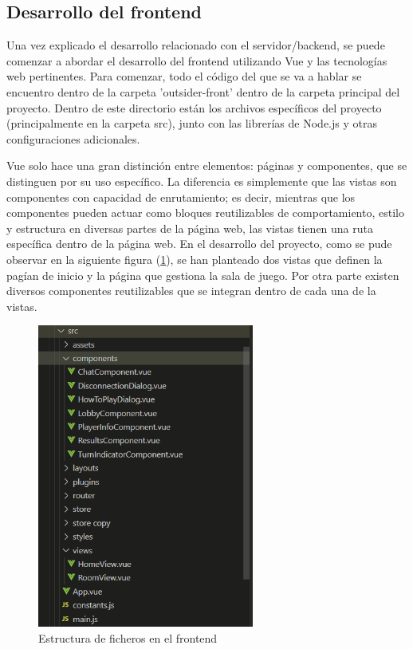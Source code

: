 \subsection{Desarrollo del frontend} \label{Desarrollo del frontend}

Una vez explicado el desarrollo relacionado con el servidor/backend, se puede comenzar a abordar el desarrollo del frontend utilizando Vue
y las tecnologías web pertinentes. Para comenzar, todo el código del que se va a hablar se encuentro dentro de la carpeta 'outsider-front' dentro de la carpeta
principal del proyecto. Dentro de este directorio están los archivos específicos del proyecto (principalmente en la carpeta src), junto con las librerías de Node.js y otras 
configuraciones adicionales.

Vue solo hace una gran distinción entre elementos: páginas y componentes, que se distinguen por su uso específico. La diferencia es simplemente que 
las vistas son componentes con capacidad de enrutamiento; es decir, mientras que los componentes pueden actuar como bloques reutilizables de comportamiento, estilo 
y estructura en diversas partes de la página web, las vistas tienen una ruta específica dentro de la página web. En el desarrollo del proyecto, como se pude observar 
en la siguiente figura (\ref{fig:res_estructFronted}), se han planteado dos vistas que definen la pagían de inicio y la página que gestiona la sala de juego. Por otra parte
existen diversos componentes reutilizables que se integran dentro de cada una de la vistas.

\begin{figure}[h]
	\centering
	\includegraphics[height=10cm,clip=true]{res_estructFronted.png}
	\caption{Estructura de ficheros en el frontend}
	\label{fig:res_estructFronted}
\end{figure}

